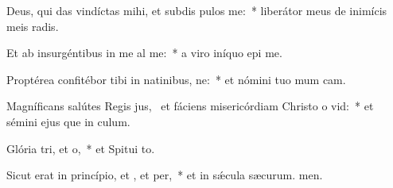 \item Deus, qui das vindíctas mihi, et subdis pulos  me:~* liberátor meus de inimícis meis radis.
\item Et ab insurgéntibus in me al me:~* a viro iníquo epi me.
\item Proptérea confitébor tibi in natinibus, ne:~* et nómini tuo mum cam.
\item Magníficans salútes Regis jus,~\pscross{} et fáciens misericórdiam Christo o vid:~* et sémini ejus que in culum.
\item Glória tri, et o,~* et Spitui to.
\item Sicut erat in princípio, et , et per,~* et in sǽcula sæcurum. men.

